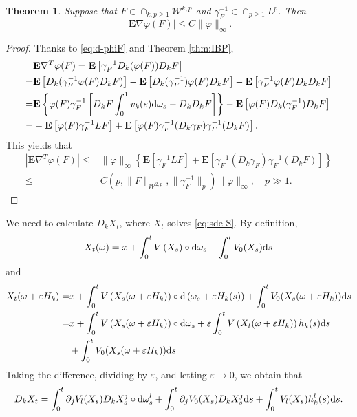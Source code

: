 \documentclass[twoside, 12pt]{book}
\numberwithin{equation}{chapter}
\newtheorem{theorem}{Theorem}[section]
\def\bE{{\mathbf E}}
\def\sW{{\mathscr W}}
\def\l{\left}
\def\r{\right}
\def\geq{\geqslant}
\def\leq{\leqslant}
\def\d{\text{\rm{d}}}
\def\eps{\varepsilon}
\begin{document}
    \begin{theorem}
    	Suppose that  $F\in \cap_{k,p\geq 1}\sW^{k,p}$ and $\gamma_F^{-1}\in \cap_{p\geq 1} L^{p}$. Then 
    	\[
    	    \l| \bE \nabla \varphi(F) \r| \leq C \|\varphi\|_\infty. 
    	\]
    \end{theorem}
    \begin{proof}
    	Thanks to \eqref{eq:d-phiF} and Theorem \ref{thm:IBP}, 
    	\begin{equation*}
    		\begin{aligned}
    			&\bE \nabla^T \varphi(F)=\bE \l[ \gamma_{F}^{-1} D_k(\varphi(F)) D_k F \r]\\
    			=& \bE \l[D_k( \gamma_{F}^{-1} \varphi(F) D_kF)\r]-\bE \l[ D_k(\gamma_{F}^{-1}) \varphi(F) D_k F\r]- \bE \l[ \gamma_{F}^{-1}\varphi(F) D_kD_k F\r]\\
    			=& \bE \l\{ \varphi(F)  \gamma_{F}^{-1} \l[D_kF \int_0^1 v_k(s) \d \omega_s -D_kD_k F\r] \r\} -\bE \l[ \varphi(F)  D_k(\gamma_{F}^{-1}) D_k F\r] \\
    			=&- \bE \l[ \varphi(F) \gamma_F^{-1} LF\r] + \bE \l[ \varphi(F) \gamma_F^{-1} (D_k\gamma_F) \gamma_F^{-1} (D_k F) \r]. 
    		\end{aligned}
    	\end{equation*}
    	This yields that 
    	\begin{align*}
    		\l| \bE \nabla^T \varphi(F) \r| \leq& \|\varphi\|_\infty  \l\{ \bE [\gamma_F^{-1} LF]+ \bE \l[\gamma_F^{-1} (D_k\gamma_F) \gamma_F^{-1} (D_k F)\r] \r\}\\
    		\leq& C(p, \|F\|_{\sW^{2,p}}, \|\gamma_F^{-1}\|_p) \|\varphi\|_\infty, \quad p\gg 1. 
    	\end{align*}
    \end{proof}
    
    We need to calculate $D_k X_t$, where $X_t$ solves \eqref{eq:sde-S}.  By definition, 
    \[
    X_t(\omega)=x+\int_0^t V \left(X_s\right) \circ \d \omega_s + \int_0^t V_0(X_s) \d s 
    \]
    and 
    \begin{equation*}
    	\begin{aligned}
    		X_t(\omega+\varepsilon H_k)=&x+\int_0^t V \left(X_s(\omega+\varepsilon H_k)\right) \circ \d\left(\omega_s+\varepsilon H_k(s)\right) +\int_0^t V_0(X_s(\omega+\eps H_k)) \d s\\
    		=&x+\int_0^t V\left(X_s(\omega+\varepsilon H_k)\right) \circ \d \omega_s +\varepsilon \int_0^t V\left(X_t(\omega+\varepsilon H_k)\right) h_k(s) \d s \\    		
    		&+\int_0^t V_0(X_s(\omega+\eps H_k)) \d s
    	\end{aligned}
    \end{equation*}
    Taking the difference, dividing by $\eps$, and letting $\eps\to0$, we obtain that
    \begin{equation}\label{eq:DkX}
    	D_k X_t =\int_0^t \partial_j V_l (X_s) D_kX^j_s\circ \d \omega_s^l +\int_0^t \partial_j V_0 (X_s) D_kX^j_s \d s  +   \int_0^t V_l (X_s)h_k^l(s)\d s. 
    \end{equation}
    
\end{document}
